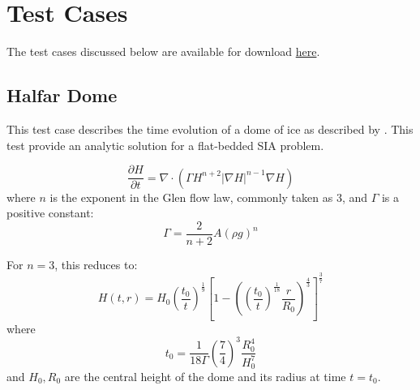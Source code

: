 \chapter{Test Cases}
\label{chap:landice_test_cases}


The test cases discussed below are available for download \href{http://mpas-dev.github.io/land_ice/download.html}{here}.



\FloatBarrier


\section{Halfar Dome}
\label{sec:halfar_description}
This test case describes the time evolution of a dome of ice as described by \citet{Halfar1983}.
This test provide an analytic solution for a flat-bedded SIA problem.

\begin{equation}
    \label{halfar}
    \frac{\partial H}{\partial t} = \nabla \cdot (\Gamma H^{n+2} |\nabla H|^{n-1} \nabla H)
\end{equation}
where $n$ is the exponent in the Glen flow law, commonly taken as 3, and $\Gamma$ is a positive constant:
\begin{equation}
    \Gamma = \frac{2}{n+2} A (\rho g)^n
\end{equation}

For $n=3$, this reduces to:
\begin{equation}
    H(t,r) = H_0 \left(\frac{t_0}{t}\right)^\frac{1}{9}  \left[ 1 - \left(  \left( \frac{t_0}{t} \right) ^ \frac{1}{18} \frac{r}{R_0} \right)^\frac{4}{3} \right] ^ \frac{3}{7}
\end{equation}
where
\begin{equation}
    t_0 = \frac{1}{18\Gamma} \left( \frac{7}{4} \right)^3 \frac{R_0^4}{H_0^7}
\end{equation}
and $H_0, R_0$ are the central height of the dome and its radius at time $t=t_0$.

